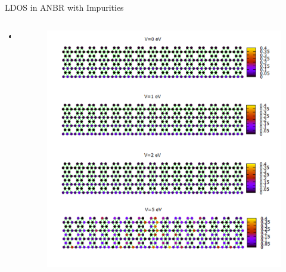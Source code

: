 \documentclass[handout,t]{beamer}
\begin{document}
\begin{frame}{LDOS in ANBR with Impurities}
	\begin{columns}
		\begin{column}[t]{.5\linewidth}
			\begin{itemize}
				\item 
			\end{itemize}
		\end{column}
		\begin{column}[t]{.5\linewidth}
			\begin{figure}[!ht]
				\centering
				\includegraphics[width=\linewidth]{../figures/Slide3.PNG}
				\label{armCSLDOS}
			  \end{figure}
		\end{column}
	\end{columns}
\end{frame}
\end{document}
